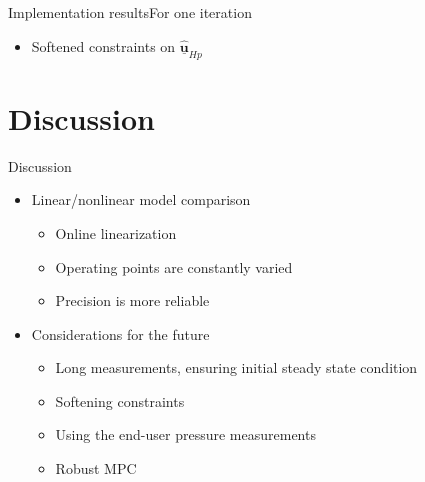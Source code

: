 \begin{frame}{Implementation results}{For one iteration}

\begin{itemize}
	 	\item<1-> Softened constraints on $\hat{\pmb{\underline{u}}}_{Hp}$
	 	\end{itemize}

\begin{figure}[H]
   \centering
    
\end{figure}

\end{frame}


\section{Discussion}
\begin{frame}{Discussion}{}

\begin{itemize}
	\item<1->Linear/nonlinear model comparison
	\begin{itemize}
	 \item<1-> Online linearization
	 \item<1-> Operating points are constantly varied
	 \item<1-> Precision is more reliable

	\end{itemize}
\end{itemize}

\begin{itemize}
\item<2-> Considerations for the future
	 \begin{itemize}
	 \item<2-> Long measurements, ensuring initial steady state condition
	 \item<2-> Softening constraints
	 \item<2-> Using the end-user pressure measurements
	 \item<2-> Robust MPC
	 \end{itemize}
\end{itemize}

\end{frame}
